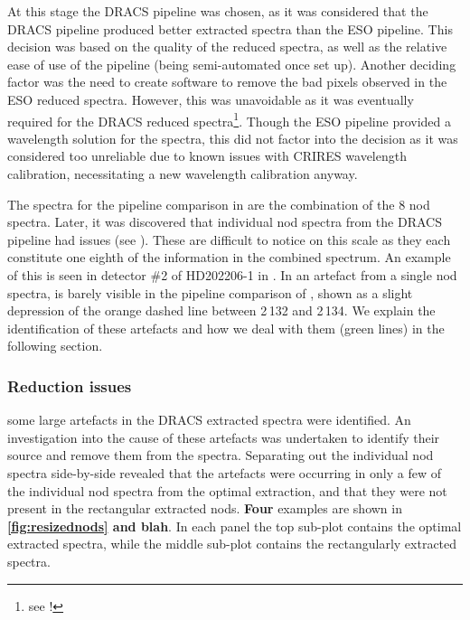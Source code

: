 At this stage the {DRACS} pipeline was chosen, as it was considered that the {DRACS} pipeline produced better extracted spectra than the {ESO} pipeline. This decision was based on the quality of the reduced spectra, as well as the relative ease of use of the pipeline (being semi-automated once set up). Another deciding factor was the need to create software to remove the bad pixels observed in the {ESO} reduced spectra. However, this was unavoidable as it was eventually required for the {DRACS} reduced spectra\footnote{see !}. Though the {ESO} pipeline provided a wavelength solution for the spectra, this did not factor into the decision as it was considered too unreliable due to known issues with {CRIRES} wavelength calibration, necessitating a new wavelength calibration anyway.

The spectra for the pipeline comparison in  are the combination of the 8 nod spectra. Later, it was discovered that individual nod spectra from the {DRACS} pipeline had issues (see ). These are difficult to notice on this scale as they each constitute one eighth of the information in the combined spectrum. An example of this is seen in detector \#2 of {HD202206-1} in . In  an artefact from a single nod spectra, is barely visible in the pipeline comparison of , shown as a slight depression of the orange dashed line between 2\,132 and 2\,134\nm{}. We explain the identification of these artefacts and how we deal with them (green lines) in the following section.

\subsubsection{Reduction issues}
\label{subsubsec:reductionartefacts}
\textbf{} some large artefacts in the {DRACS} extracted spectra were identified. An investigation into the cause of these artefacts was undertaken to identify their source and remove them from the spectra. Separating out the individual nod spectra side-by-side revealed that the artefacts were occurring in only a few of the individual nod spectra from the optimal extraction, and that they were not present in the rectangular extracted nods. \textbf{Four} examples are shown in \textbf{\ref{fig:resizednods} and blah}. In each panel the top sub-plot contains the optimal extracted spectra, while the middle sub-plot contains the rectangularly extracted spectra.


